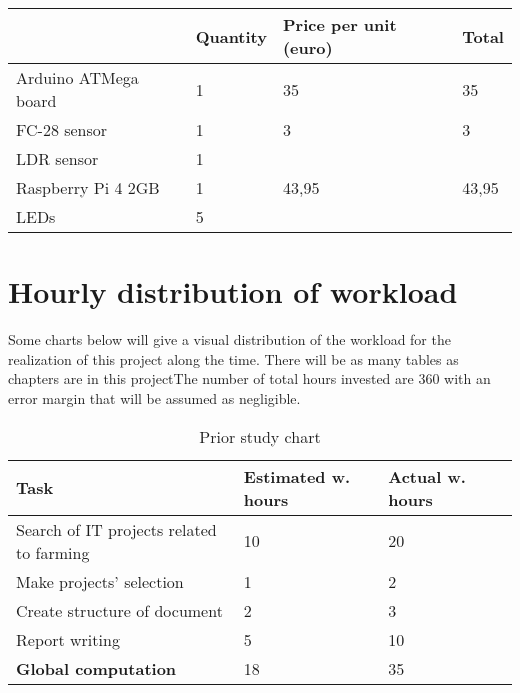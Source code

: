 \begin{table}[H]
\begin{tabular}{llll}
\hline
	& \textbf{Quantity}& \textbf{Price per unit (euro)}& \textbf{Total} \\ \hline
	\rowcolor{lightgray} 
Arduino ATMega board & 1                                        & 35                                                 & 35                                    \\
FC-28 sensor         & 1                                        & 3                                                  & 3                                     \\
	\rowcolor{lightgray} 
LDR sensor	     & 1                                        &                                                    &                                       \\
Raspberry Pi 4 2GB   & 1                                        & 43,95                                              & 43,95                                 \\
\rowcolor{lightgray} 
LEDs                 & 5                                        &                                                    &                                      
\end{tabular}
\end{table}

\section{Hourly distribution of workload}
Some charts below will give a visual distribution of the workload for the realization of this project along the time. There will be as many tables as chapters are in this projectThe number of total hours invested are 360 with an error margin that will be assumed as negligible.

\begin{table}[H]
\caption{Prior study chart}
\begin{tabular}{llll}
\hline
                               \textbf{Task}    & \textbf{Estimated w. hours} & \textbf{Actual w. hours} \\ \hline
\rowcolor{lightgray}
Search of IT projects related to farming        & 10                          & 20                     \\
Make projects' selection                        & 1                           & 2                      \\
\rowcolor{lightgray}
Create structure of document                    & 2                           & 3                      \\
Report writing                                  & 5                           & 10                     \\
\rowcolor{lightgray}
\textbf{Global computation}                     & 18                          & 35                     \\
\end{tabular}
\end{table}

